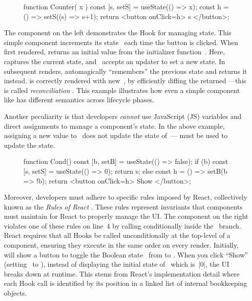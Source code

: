 \begin{figure}
  \vspace*{-1.1\intextsep}
  \begin{reactcode}
function Counter({ x }) {
  const [s, setS] = useState(() => x);
  const h = () => setS((s) => s+1);
  return <button onClick={h}>
    {s}
  </button>; }
  \end{reactcode}
\end{figure}
\noindent The  component on the left demonstrates the  Hook for managing state.
This simple component increments its state~ each time the button is clicked.
When first rendered,  returns an initial value from the initializer function~.
Here,~ captures the current state, and ~accepts an updater to set a new state.
In subsequent renders,  automagically ``remembers'' the previous state and returns it instead.
 is correctly rendered with new~, by efficiently diffing the returned ---this is called \emph{reconciliation} \citep{Met25Reconciliation}.
This example illustrates how even a simple component like  has different semantics across lifecycle phases.

Another peculiarity is that developers \emph{cannot} use JavaScript (JS) variables and direct assignments to manage a component's state.
In the above example, assigning a new value to~ does not update the state of~--- must be used to update the state.

\begin{figure}
  \vspace*{.3\intextsep}
  \begin{reactcode}
function Cond() {
  const [b, setB] = useState(() => false);
  if (b) {
    const [s, setS] = useState(() => 0);
    return s;
  } else {
    const h = () => setB(b => !b);
    return <button onClick={h}>
      Show
    </button>; } }
  \end{reactcode}
\end{figure}
Moreover, developers must adhere to specific rules imposed by React, collectively known as the \emph{Rules of React} \citep{Met25Rules}.
These rules represent invariants that components must maintain for React to properly manage the UI.
The  component on the right violates one of these rules on line~4 by calling  conditionally inside the ~branch.
React requires that all Hooks be called unconditionally at the top-level of a component, ensuring they execute in the same order on every render.
Initially,  will show a button to toggle the Boolean state~ from  to .
When you click ``Show'' (setting~ to ), instead of displaying the initial state of~ which is~|0|, the UI breaks down at runtime.
This stems from React's implementation detail where each Hook call is identified by its position in a linked list of internal bookkeeping objects.


